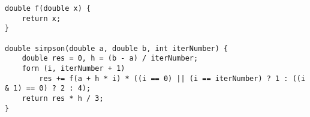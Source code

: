\begin{verbatim}
double f(double x) {
	return x;
}	

double simpson(double a, double b, int iterNumber) {
	double res = 0, h = (b - a) / iterNumber;
	forn (i, iterNumber + 1)
		res += f(a + h * i) * ((i == 0) || (i == iterNumber) ? 1 : ((i & 1) == 0) ? 2 : 4);
	return res * h / 3;
}
\end{verbatim}
